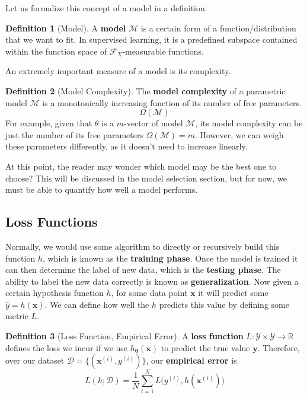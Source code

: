\documentclass{article}
\theoremstyle{definition}
\newtheorem{definition}{Definition}[section]
\begin{document}
    Let us formalize this concept of a model in a definition. 

    \begin{definition}[Model]
      A \textbf{model} $\mathcal{M}$ is a certain form of a function/distribution that we want to fit. In supervised learning, it is a predefined subspace contained within the function space of $\mathcal{F}_X$-measurable functions. 
    \end{definition}

    An extremely important measure of a model is its complexity. 

    \begin{definition}[Model Complexity]
      The \textbf{model complexity} of a parametric model $\mathcal{M}$ is a monotonically increasing function of its number of free parameters. 
      \[\Omega(\mathcal{M})\]
      For example, given that $\theta$ is a $m$-vector of model $\mathcal{M}$, its model complexity can be just the number of its free parameters $\Omega(\mathcal{M}) = m$. However, we can weigh these parameters differently, as it doesn't need to increase linearly. 
    \end{definition}

    At this point, the reader may wonder which model may be the best one to choose? This will be discussed in the model selection section, but for now, we must be able to quantify how well a model performs. 

  \subsection{Loss Functions}

    Normally, we would use some algorithm to directly or recursively build this function $h$, which is known as the \textbf{training phase}. Once the model is trained it can then determine the label of new data, which is the \textbf{testing phase}. The ability to label the new data correctly is known as \textbf{generalization}. Now given a certain hypothesis function $h$, for some data point $\mathbf{x}$ it will predict some $\hat{y} = h(\mathbf{x})$. We can define how well the $h$ predicts this value by defining some metric $L$. 

    \begin{definition}[Loss Function, Empirical Error]
    A \textbf{loss function} $L: \mathcal{Y} \times \mathcal{Y} \rightarrow \mathbb{R}$ defines the loss we incur if we use $h_{\boldsymbol{\theta}} (\mathbf{x})$ to predict the true value $\mathbf{y}$. Therefore, over our dataset $\mathcal{D} = \{(\mathbf{x}^{(i)}, y^{(i)})\}$, our \textbf{empirical error} is 
    \[L(h; \mathcal{D}) = \frac{1}{N} \sum_{i=1}^N L\big( y^{(i)}, h(\mathbf{x}^{(i)}) \big)\]
    \end{definition}
\end{document}
